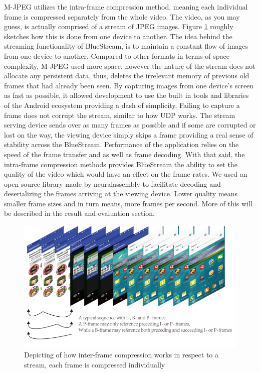 \documentclass[a4paper,12pt]{article}
\begin{document}
M-JPEG utilizes the intra-frame compression method, meaning each individual frame is compressed separately from the whole video. The video, as you may guess, is actually comprised of a stream of  JPEG images. Figure \ref{fig:MJPEG} roughly sketches how this is done from one device to another. The idea behind the streaming functionality of BlueStream, is to maintain a constant flow of images from one device to another. Compared to other formats in terms of space complexity, M-JPEG used more space, however the nature of the stream does not allocate any persistent data, thus, deletes the irrelevant memory of previous old frames that had already been seen. By capturing images from one device’s screen as fast as possible, it allowed development to use the built in tools and libraries of the Android ecosystem providing a dash of simplicity. Failing to capture a frame does not corrupt the stream, similar to how UDP works. The stream serving device sends over as many frames as possible and if some are corrupted or lost on the way, the viewing device simply skips a frame providing a real sense of stability across the BlueStream. Performance of the application relies on the speed of the frame transfer and as well as frame decoding. With that said, the intra-frame compression methods provides BlueStream the ability to set the quality of the video which would have an effect on the frame rates. We used an open source library made by neuralassembly \cite{SimpleMjpegView} to facilitate decoding and deserializing the frames arriving at the viewing device. Lower quality means smaller frame sizes and in turn means, more frames per second. More of this will be described in the result and evaluation section. 

\begin{figure}[h!]
\centering
\includegraphics[scale=.7]{Figures/Figure6.png}
\caption{Depicting of how inter-frame compression works in respect to a stream, each frame is compressed individually}
\label{fig:MJPEG}
\end{figure}
\end{document}
